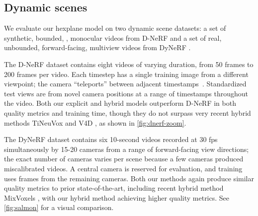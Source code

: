 \documentclass[10pt,twocolumn,letterpaper]{article}
\begin{document}
\subsection{Dynamic scenes}
\label{sec:video}



We evaluate our hexplane model on two dynamic scene datasets: a set of synthetic, bounded, , monocular videos from D-NeRF \cite{dnerf} and a set of real, unbounded, forward-facing, multiview videos from DyNeRF \cite{dynerf}.
 

The D-NeRF dataset contains eight videos of varying duration, from 50 frames to 200 frames per video. Each timestep has a single training image from a different viewpoint; the camera ``teleports'' between adjacent timestamps~\cite{gao22teleport}. Standardized test views are from novel camera positions at a range of timestamps throughout the video. Both our explicit and hybrid models outperform D-NeRF in both quality metrics and training time, though they do not surpass very recent hybrid methods TiNeuVox \cite{tineuvox} and V4D \cite{v4d}, as shown in \cref{fig:dnerf-zoom}.

The DyNeRF dataset contains six 10-second videos recorded at 30 fps simultaneously by 15-20 cameras from a range of forward-facing view directions; the exact number of cameras varies per scene because a few cameras produced miscalibrated videos. A central camera is reserved for evaluation, and training uses frames from the remaining cameras. Both our methods again produce similar quality metrics to prior state-of-the-art, including recent hybrid method MixVoxels \cite{mixvoxels}, with our hybrid method achieving higher quality metrics. See \cref{fig:salmon} for a visual comparison.
\end{document}
